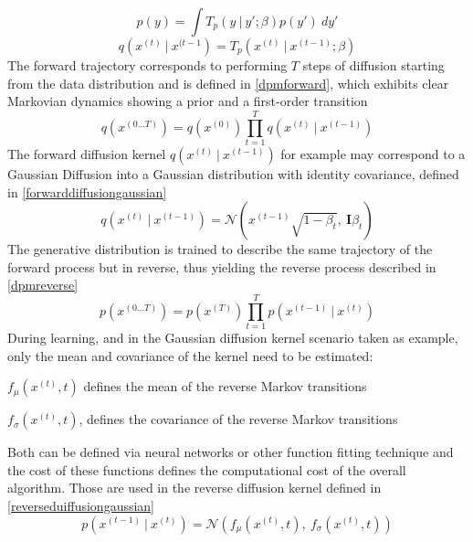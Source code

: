 \documentclass[conference]{IEEEtran}
\begin{document}
\begin{equation}
p(y)=\int T_p(y\:|\:y';\beta)p(y')\:dy'
\label{dpmpy}
\end{equation}
\begin{equation}
q\left(x^{(t)}\:|\:x^{(t-1}\right) = T_p\left(x^{(t)}\:|\:x^{(t-1)};\beta\right)
\label{dpmqx}
\end{equation}
The forward trajectory corresponds to performing $T$ steps of diffusion starting from the data distribution and is defined in \eqref{dpmforward}, which exhibits clear Markovian dynamics showing a prior and a first-order transition
\begin{equation}
q\left(x^{(0\ldots T)}\right)=q\left(x^{(0)}\right)\prod^T_{t=1}q\left(x^{(t)}\:|\:x^{(t-1)}\right)
\label{dpmforward}
\end{equation}
The forward diffusion kernel $q\left(x^{(t)}\:|\:x^{(t-1)}\right)$ for example may correspond to a Gaussian Diffusion into a Gaussian distribution with identity covariance, defined in \eqref{forwarddiffusiongaussian}
\begin{equation}
q\left(x^{(t)}\:|\:x^{(t-1)}\right) = \mathcal{N}\left(x^{(t-1)}\sqrt{1-\beta_t},\:\mathbf{I}\beta_t\right)
\label{forwarddiffusiongaussian}
\end{equation}
The generative distribution is trained to describe the same trajectory of the forward process but in reverse, thus yielding the reverse process described in \eqref{dpmreverse}
\begin{equation}
p\left(x^{(0\ldots T)}\right)=p\left(x^{(T)}\right)\prod^T_{t=1}p\left(x^{(t-1)}\:|\:x^{(t)}\right)
\label{dpmreverse}
\end{equation}
During learning, and in the Gaussian diffusion kernel scenario taken as example, only the mean and covariance of the kernel need to be estimated:
\begin{list}{-}{}
	\item $f_\mu(x^{(t)}, t)$ defines the mean of the reverse Markov transitions
	\item $f_\sigma(x^{(t)}, t)$, defines the covariance of the reverse Markov transitions
\end{list}
Both can be defined via neural networks or other function fitting technique and the cost of these functions defines the computational cost of the overall algorithm. Those are used in the reverse diffusion kernel defined in \eqref{reverseduiffusiongaussian}
\begin{equation}
p\left(x^{(t-1)}\:|\:x^{(t)}\right)=\mathcal{N}\left(f_\mu(x^{(t)},t),\:f_\sigma(x^{(t)},t)\right)
\label{reverseduiffusiongaussian}
\end{equation}
\end{document}
